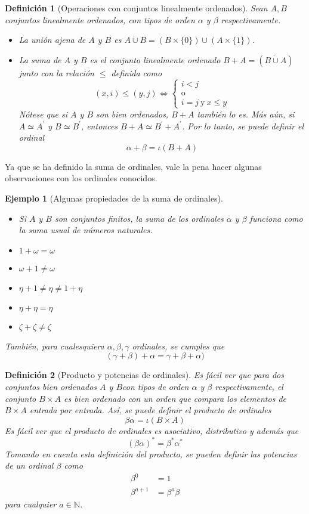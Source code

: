 \documentclass[12pt,letterpaper,titlepage]{article}
\newtheorem*{defn}{Definición}
\newtheorem*{exa}{Ejemplo}
\theoremstyle{definition}
\newcommand\<{\langle}
\renewcommand\>{\rangle}
\begin{document}
\begin{defn}[Operaciones con conjuntos linealmente ordenados]
  Sean $A,B$ conjuntos linealmente ordenados, con tipos de orden $\alpha$ y $\beta$ respectivamente.
  \begin{itemize}
      \item La unión ajena de $A$ y $B$ es $A\dot\cup B=(B\times\{0\})\cup(A\times\{1\})$.
      \item La suma de $A$ y $B$ es el conjunto linealmente ordenado $B+A=(B\dot\cup A)$ junto con la relación $\leq$ definida como
      $$(x,i)\leq(y,j)\iff\begin{cases}
          i<j\\
          \text{o}\\
          i=j \ \text{y} \ x\leq y
      \end{cases}$$
      Nótese que si $A$ y $B$ son bien ordenados, $B+A$ también lo es. Más aún, si $A\simeq A^\prime$ y $B\simeq B^\prime$, entonces $B+A\simeq B^\prime+A^\prime$. Por lo tanto, se puede definir el ordinal
      $$\alpha+\beta=\iota(B+A)$$
  \end{itemize}
\end{defn}
Ya que se ha definido la suma de ordinales, vale la pena hacer algunas observaciones con los ordinales conocidos.
\begin{exa}[Algunas propiedades de la suma de ordinales]
    \leavevmode
   \begin{itemize}
       \item Si $A$ y $B$ son conjuntos finitos, la suma de los ordinales $\alpha$ y $\beta$ funciona como la suma usual de números naturales.
       \item $1+\omega=\omega$
       \item $\omega+1\neq\omega$
       \item $\eta+1\neq \eta \neq 1+\eta$
       \item $\eta+\eta=\eta$
       \item $\zeta+\zeta\neq\zeta$
   \end{itemize} 
   También, para cualesquiera $\alpha,\beta,\gamma$ ordinales, se cumples que 
   $$(\gamma+\beta)+\alpha=\gamma+\beta+\alpha)$$
\end{exa}
\begin{defn}[Producto y potencias de ordinales]
  Es fácil ver que para dos conjuntos bien ordenados $A$ y $B$con tipos de orden $\alpha$ y $\beta$ respectivamente, el conjunto $B\times A$ es bien ordenado con un orden que compara los elementos de $B\times A$ entrada por entrada. Así, se puede definir el producto de ordinales
  $$\beta\alpha=\iota(B\times A)$$
  Es fácil ver que el producto de ordinales es asociativo, distributivo y además que 
  $$(\beta\alpha)^*=\beta^*\alpha^*$$
  Tomando en cuenta esta definición del producto, se pueden definir las potencias de un ordinal $\beta$ como
  \begin{align*}
      \beta^0&=1\\
      \beta^{a+1}&=\beta^{a}\beta
  \end{align*}
  para cualquier $a\in\mathbb{N}$.
\end{defn}
\end{document}
